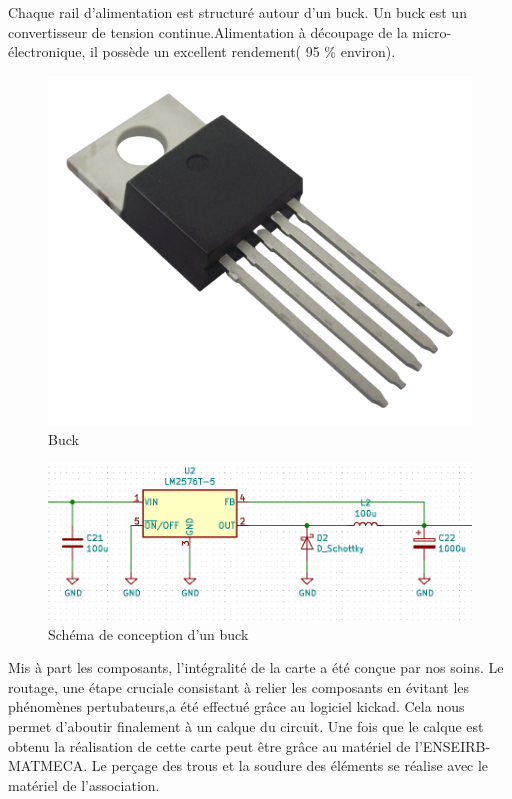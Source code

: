 \documentclass[a4paper,10pt]{article}
\begin{document}
\begin{spacing}{1.5}
Chaque rail d'alimentation est structuré autour d'un buck. Un buck est un
convertisseur de tension continue.Alimentation à découpage de la
micro-électronique, il possède un excellent rendement( 95 \% environ).

\begin{multicols}{2}
\begin{figure}[H]
  \center
  \includegraphics[scale=0.2]{buck.png}
  \caption{Buck}
\end{figure}
\columnbreak
\begin{figure}[H]
  \center
  \includegraphics[scale=0.4]{buck.PNG}
  \caption{Schéma de conception d'un buck}
\end{figure}
\end{multicols}
Mis à part les composants, l'intégralité de la carte a été conçue par nos soins.
Le routage, une étape cruciale consistant à relier les composants en évitant les
phénomènes pertubateurs,a été effectué grâce au logiciel kickad. Cela nous
permet d'aboutir finalement à un calque du circuit. Une fois que le calque est
obtenu la réalisation de cette carte peut être grâce au
matériel de l'ENSEIRB-MATMECA. Le perçage des trous et la soudure des éléments
se réalise avec le matériel de l'association.


\end{spacing}
\end{document}
